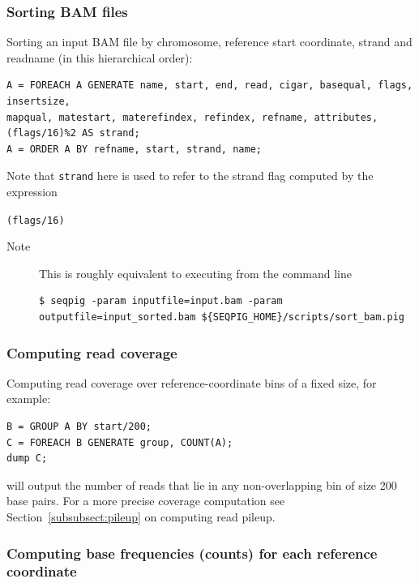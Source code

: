 \subsubsection{Sorting BAM files}
Sorting an input BAM file by chromosome, reference start coordinate, strand
and readname (in this hierarchical order):
\begin{lstlisting}
A = FOREACH A GENERATE name, start, end, read, cigar, basequal, flags, insertsize,
mapqual, matestart, materefindex, refindex, refname, attributes, (flags/16)%2 AS strand;
A = ORDER A BY refname, start, strand, name;
\end{lstlisting}
Note that {\tt strand} here is used to refer to the strand flag computed by the expression
{\tt (flags/16)%
\begin{description}
	\item[Note] This is roughly equivalent to executing from the command line
\begin{lstlisting}
$ seqpig -param inputfile=input.bam -param outputfile=input_sorted.bam ${SEQPIG_HOME}/scripts/sort_bam.pig
\end{lstlisting}
\end{description}

 \subsubsection{Computing read coverage}
Computing read coverage over reference-coordinate bins of a fixed size,
for example:
\begin{lstlisting}
B = GROUP A BY start/200;
C = FOREACH B GENERATE group, COUNT(A);
dump C; 
\end{lstlisting}
will output the number of reads that lie in any non-overlapping bin of size 200 base pairs.
For a more precise coverage computation see Section~\ref{subsubsect:pileup} on computing
read pileup.

 \subsubsection{Computing base frequencies (counts) for each reference coordinate}

}

